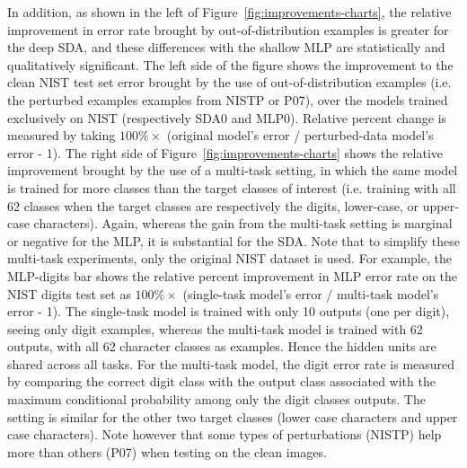 \documentclass{article} %
\begin{document}
In addition, as shown in the left of
Figure~\ref{fig:improvements-charts}, the relative improvement in error
rate brought by out-of-distribution examples is greater for the deep
SDA, and these
differences with the shallow MLP are statistically and qualitatively
significant. 
The left side of the figure shows the improvement to the clean
NIST test set error brought by the use of out-of-distribution examples
(i.e. the perturbed examples examples from NISTP or P07),
over the models trained exclusively on NIST (respectively SDA0 and MLP0).
Relative percent change is measured by taking
$100 \% \times$ (original model's error / perturbed-data model's error - 1).
The right side of
Figure~\ref{fig:improvements-charts} shows the relative improvement
brought by the use of a multi-task setting, in which the same model is
trained for more classes than the target classes of interest (i.e. training
with all 62 classes when the target classes are respectively the digits,
lower-case, or upper-case characters). Again, whereas the gain from the
multi-task setting is marginal or negative for the MLP, it is substantial
for the SDA.  Note that to simplify these multi-task experiments, only the original
NIST dataset is used. For example, the MLP-digits bar shows the relative
percent improvement in MLP error rate on the NIST digits test set 
as $100\% \times$ (single-task
model's error / multi-task model's error - 1).  The single-task model is
trained with only 10 outputs (one per digit), seeing only digit examples,
whereas the multi-task model is trained with 62 outputs, with all 62
character classes as examples.  Hence the hidden units are shared across
all tasks.  For the multi-task model, the digit error rate is measured by
comparing the correct digit class with the output class associated with the
maximum conditional probability among only the digit classes outputs.  The
setting is similar for the other two target classes (lower case characters
and upper case characters). Note however that some types of perturbations
(NISTP) help more than others (P07) when testing on the clean images.

\end{document}
